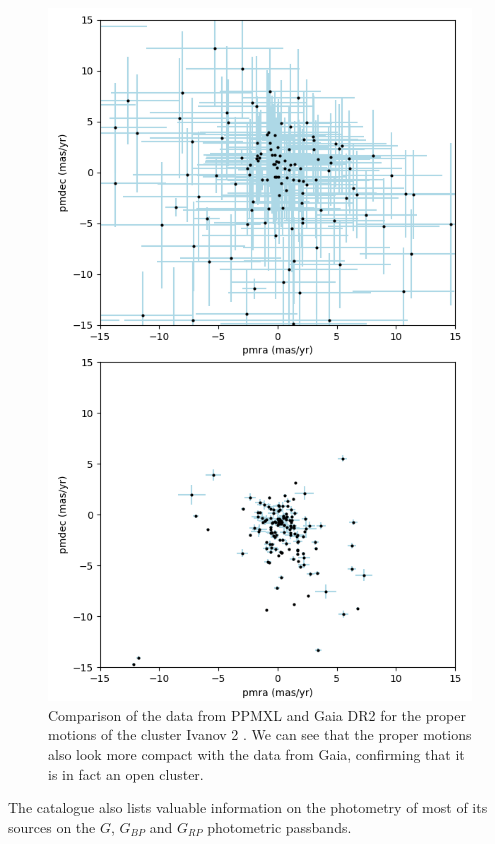 \documentclass[twocolumn]{revtex4}
\begin{document}
\begin{figure}[h!]
\centering
\includegraphics[scale=0.45]{ppmxl_vs_gaia_motions}
\caption{Comparison of the data from PPMXL and Gaia DR2 for the proper motions of the cluster Ivanov 2 \cite{ivanov}. We can see that the proper motions also look more compact with the data from Gaia, confirming that it is in fact an open cluster.}
\label{ppmxl_vs_gaiadr2}
\end{figure}

The catalogue also lists valuable information on the photometry of most of its sources on the $G$, $G_{BP}$ and $G_{RP}$ photometric passbands.
\end{document}
